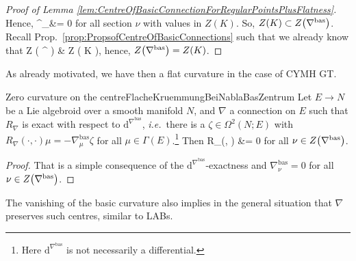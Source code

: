 \begin{proof}[Proof of Lemma \ref{lem:CentreOfBasicConnectionForRegularPointsPlusFlatness}]
Hence,
\bas
\nabla^{}_\nu &= 0
\eas
for all section $\nu$ with values in $Z(K)$. So, $Z(K) \subset Z \mleft( \nabla^{\mathrm{bas}} \mright)$. Recall Prop.~\ref{prop:PropsofCentreOfBasicConnections} such that we already know that
\bas
Z \mleft( \nabla^{} \mright)
&\subset
Z \mleft( K \mright),
\eas
hence, $Z \mleft( \nabla^{\mathrm{bas}} \mright) = Z(K)$.
%
\end{proof}

As already motivated, we have then a flat curvature in the case of CYMH GT.

\begin{corollaries}{Zero curvature on the centre}{FlacheKruemmungBeiNablaBasZentrum}
Let $E \to N$ be a Lie algebroid over a smooth manifold $N$, and $\nabla$ a connection on $E$ such that $R_\nabla$ is exact with respect to $\mathrm{d}^{\nabla^{\mathrm{bas}}}$, \textit{i.e.}~there is a $\zeta \in \Omega^2(N;E)$ with $R_\nabla(\cdot, \cdot) \mu = - \nabla^{\mathrm{bas}}_\mu \zeta$ for all $\mu \in \Gamma(E)$.\footnote{Here $\mathrm{d}^{\nabla^{\mathrm{bas}}}$ is not necessarily a differential.} Then
\ba
R_\nabla(\cdot, \cdot) \nu
&=
0
\ea
for all $\nu \in Z \mleft( \nabla^{\mathrm{bas}} \mright)$.
\end{corollaries}

\begin{proof}
\leavevmode\newline
That is a simple consequence of the $\mathrm{d}^{\nabla^{\mathrm{bas}}}$-exactness and $\nabla_\nu^{\mathrm{bas}} = 0$ for all $\nu \in Z \mleft( \nabla^{\mathrm{bas}} \mright)$.
\end{proof}

The vanishing of the basic curvature also implies in the general situation that $\nabla$ preserves such centres, similar to LABs.


